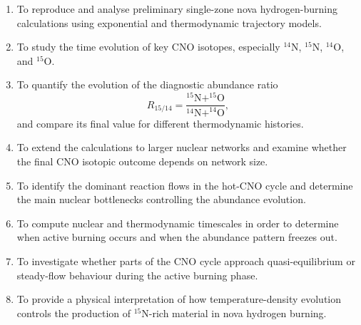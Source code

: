 \begin{enumerate}
    \item To reproduce and analyse preliminary single-zone nova hydrogen-burning calculations using exponential and thermodynamic trajectory models.

    \item To study the time evolution of key CNO isotopes, especially $^{14}\mathrm{N}$, $^{15}\mathrm{N}$, $^{14}\mathrm{O}$, and $^{15}\mathrm{O}$.

    \item To quantify the evolution of the diagnostic abundance ratio
    \[
    R_{15/14} =
    \frac{^{15}\mathrm{N}+^{15}\mathrm{O}}
    {^{14}\mathrm{N}+^{14}\mathrm{O}},
    \]
    and compare its final value for different thermodynamic histories.

    \item To extend the calculations to larger nuclear networks and examine whether the final CNO isotopic outcome depends on network size.

    \item To identify the dominant reaction flows in the hot-CNO cycle and determine the main nuclear bottlenecks controlling the abundance evolution.

    \item To compute nuclear and thermodynamic timescales in order to determine when active burning occurs and when the abundance pattern freezes out.

    \item To investigate whether parts of the CNO cycle approach quasi-equilibrium or steady-flow behaviour during the active burning phase.

    \item To provide a physical interpretation of how temperature-density evolution controls the production of $^{15}\mathrm{N}$-rich material in nova hydrogen burning.
\end{enumerate}